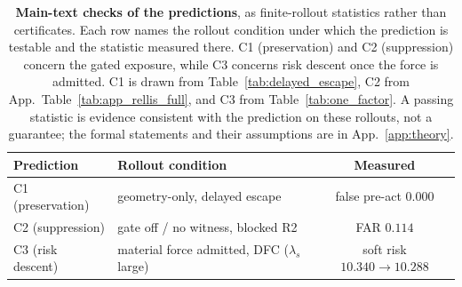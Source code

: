 \begin{table}[t]
\centering
\caption{\textbf{Main-text checks of the predictions}, as finite-rollout
statistics rather than certificates. Each row names the rollout condition under
which the prediction is testable and the statistic measured there. C1
(preservation) and C2 (suppression) concern the gated exposure, while C3 concerns
risk descent once the force is admitted. C1 is drawn from
Table~\ref{tab:delayed_escape}, C2 from
App.~Table~\ref{tab:app_rellis_full}, and C3 from Table~\ref{tab:one_factor}.
A passing statistic is evidence consistent with the prediction on these
rollouts, not a guarantee; the formal statements and their assumptions are in
App.~\ref{app:theory}.}
\label{tab:main_theory_checks}
\small
\setlength{\tabcolsep}{4pt}
\renewcommand{\arraystretch}{1.06}
\begin{tabular}{llc}
\toprule
Prediction & Rollout condition & Measured \\
\midrule
C1 (preservation) & geometry-only, delayed escape & false pre-act $0.000$ \\
C2 (suppression)  & gate off / no witness, blocked R2 & FAR $0.114$ \\
C3 (risk descent) & material force admitted, DFC ($\lambda_s$ large) & soft risk $10.340\!\to\!10.288$ \\
\bottomrule
\end{tabular}
\end{table}